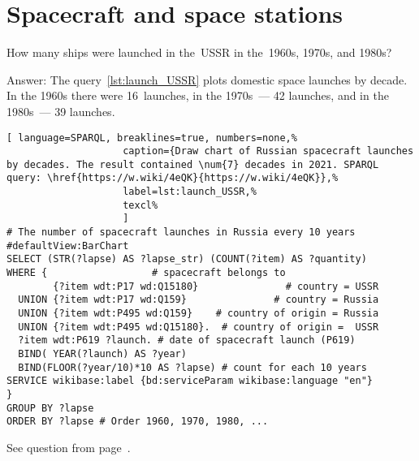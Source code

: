 \section{Spacecraft and space stations}
\label{answer:launches_USSR}
\begin{exercise}
	How many ships were launched in the~USSR in the~1960s, 1970s, and 1980s?
\end{exercise}
Answer: The query~\ref{lst:launch_USSR} plots domestic space launches by decade. In the 1960s there were 16~launches, in the 1970s~--- 42 launches, and in the 1980s~--- 39 launches.
\begin{lstlisting}[ language=SPARQL, breaklines=true, numbers=none,%
                    caption={Draw chart of Russian spacecraft launches by decades. The result contained \num{7} decades in 2021. SPARQL query: \href{https://w.wiki/4eQK}{https://w.wiki/4eQK}},%
                    label=lst:launch_USSR,%
                    texcl%
                    ]
# The number of spacecraft launches in Russia every 10 years
#defaultView:BarChart
SELECT (STR(?lapse) AS ?lapse_str) (COUNT(?item) AS ?quantity)
WHERE {                  # spacecraft belongs to
        {?item wdt:P17 wd:Q15180}               # country = USSR
  UNION {?item wdt:P17 wd:Q159}               # country = Russia
  UNION {?item wdt:P495 wd:Q159}    # country of origin = Russia
  UNION {?item wdt:P495 wd:Q15180}.  # country of origin =  USSR
  ?item wdt:P619 ?launch. # date of spacecraft launch (P619)
  BIND( YEAR(?launch) AS ?year) 
  BIND(FLOOR(?year/10)*10 AS ?lapse) # count for each 10 years
SERVICE wikibase:label {bd:serviceParam wikibase:language "en"}
} 
GROUP BY ?lapse
ORDER BY ?lapse # Order 1960, 1970, 1980, ...
\end{lstlisting}%
\small{See question from page~\pageref{question:spacecraft_1}.}

